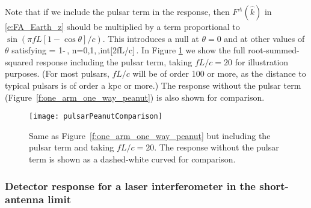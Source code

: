 Note that if we include the pulsar term in the response,
then $F^A(\hat k)$ in \eqref{e:FA_Earth_z} 
should be multiplied 
by a term proportional to $\sin(\pi f L[1-\cos\theta]/c)$.
This introduces a null at $\theta=0$ and at other values 
of $\theta$ satisfying
%
\be
\cos\theta = 1-\,,
\qquad n=0,1,\cdots\,,{\rm int}[2fL/c]\,.
\ee
%
In Figure \ref{f:one_arm_one_way_peanut_full} we show
the full root-summed-squared response 
including the pulsar term,
taking $fL/c=20$ for illustration purposes.
(For most pulsars, $fL/c$ will be of order 100 
or more, as the distance to typical pulsars is 
of order a kpc or more.)
The response without the pulsar term 
(Figure~\ref{f:one_arm_one_way_peanut}) is also
shown for comparison.
%
\begin{figure}[htbp!]
\begin{center}
\texttt{[image: pulsarPeanutComparison]}
\caption{Same as Figure~\ref{f:one_arm_one_way_peanut} but 
including the pulsar term and taking $fL/c=20$.
The response without the pulsar term is shown as a 
dashed-white curved for comparison.}
\label{f:one_arm_one_way_peanut_full}
\end{center}
\end{figure}
%

\subsubsection{Detector response for a laser interferometer 
in the short-antenna limit}

